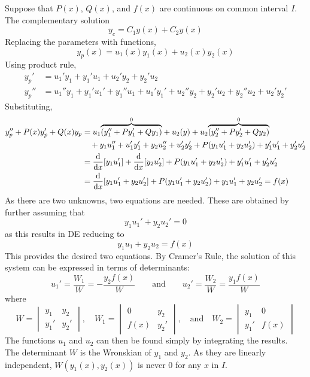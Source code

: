 \documentclass[./Differential Equations]{subfiles}
\begin{document}
				Suppose that \(P(x)\), \(Q(x)\), and \(f(x)\) are continuous on common interval \(I\). The complementary solution 
				\[y_c = C_1y(x) + C_2y(x)\]
				Replacing the parameters with functions,
				\[y_p(x) = u_1(x)y_1(x) + u_2(x)y_2(x)\]
				Using product rule,
				\begin{align*}
					y_p' &= u_1'y_1 + y_1'u_1 + u_2'y_2 + y_2'u_2 \\
					y_p'' &= u_1''y_1 + y_1'u_1' + y_1''u_1 + u_1'y_1' + u_2''y_2 + y_2'u_2 + y_2''u_2 + u_2'y_2'
				\end{align*}
				Substituting,
				\begin{align*}
					y_p'' + P(x)y_p' + Q(x)y_p &= u_1 \overset{0}{\overbrace{(y_1'' + Py_1' + Qy_1)}} + u_2(y) + u_2\overset{0}{\overbrace{(y_2'' + Py_2' + Qy_2)}} \\
						&\quad + y_1u_1'' + u_1'y_1' + y_2u_2'' + u_2'y_2' + P(y_1u_1' + y_2u_2') + y_1'u_1' + y_2'u_2'\\
						&= \dv{}{x}[y_1u_1'] + \dv{}{x}[y_2u_2'] + P(y_1u_1' + y_2u_2') + y_1'u_1' + y_2'u_2' \\
						&= \dv{}{x}[y_1u_1' + y_2u_2'] + P(y_1u_1' + y_2u_2') + y_1u_1' + y_2u_2'
								= f(x)
				\end{align*}
				As there are two unknowns, two equations are needed. These are obtained by further assuming that
				\[y_1u_1' + y_2u_2' = 0\]
				as this results in DE reducing to
				\[y_1u_1 + y_2u_2 = f(x)\]
				This provides the desired two equations. By Cramer's Rule, the solution of this system can be expressed in terms of determinants:
				\[
					u_1' = \frac{W_1}{W} = -\frac{y_2f(x)}{W} \qquad \text{and} \qquad
						u_2' = \frac{W_2}{W} = \frac{y_1f(x)}{W}
				\]
				where
				\[
					W = \begin{vmatrix}
 							y_1 & y_2 \\
 							y_1' & y_2'
 						\end{vmatrix}, \quad
 						W_1 = \begin{vmatrix}
 									0 & y_2 \\
 									f(x) & y_2'
 								\end{vmatrix}, \quad \text{and} \quad
						W_2 = \begin{vmatrix}
 									y_1 & 0 \\
 									y_1' & f(x)
 								\end{vmatrix}
				\]
				The functions \(u_1\) and \(u_2\) can then be found simply by integrating the results. \\
				The determinant \(W\) is the Wronskian of \(y_1\) and \(y_2\). As they are linearly independent, \(W(y_1(x), y_2(x))\) is never 0 for any \(x\) in \(I\).
\end{document}
